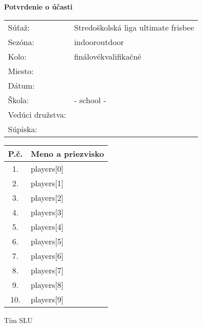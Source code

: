 \documentclass[11pt, a5paper]{article}
\newcommand{\potvrdenka}[3]{
    \renewcommand{\arraystretch}{1.48}
    \parskip=10pt
    \begin{center}
        {\LARGE\textbf{Potvrdenie o účasti}}
    \end{center}

    \begin{tabular}{p{3.2cm} l}
        Súťaž:&Stredoškolská liga ultimate frisbee\\
        Sezóna:&\if\the\sezona2 indoor\else outdoor\fi\\
        Kolo:&\if\the\kolo2 finálové\else kvalifikačné\fi\\
        Miesto:&\the\miesto\\
        Dátum:&\the\termin\\
        Škola:&#1\\
        Vedúci družstva:&#2\\
        Súpiska:
    \end{tabular}

    \vspace{-41pt}
    \begin{center}
        \begin{tabular}{|c|p{6cm}|}
            \hline
            P.č.&Meno a priezvisko\\
            \hline \hline
            #3
        \end{tabular}
    \end{center}

    \vfill
    \begin{flushright}
        \begin{minipage}{4.5cm}
            \begin{center}
                Tím SLU
            \end{center}
        \end{minipage}
    \end{flushright}
    \newpage
}
\begin{document}
\potvrdenka{ {{- school -}} }{}{
    1.& {{ players[0] }} \\ \hline
    2.& {{ players[1] }} \\ \hline
    3.& {{ players[2] }} \\ \hline
    4.& {{ players[3] }} \\ \hline
    5.& {{ players[4] }} \\ \hline
    6.& {{ players[5] }} \\ \hline
    7.& {{ players[6] }} \\ \hline
    8.& {{ players[7] }} \\ \hline
    9.& {{ players[8] }} \\ \hline
    10.& {{ players[9] }} \\ \hline
}
\end{document}
